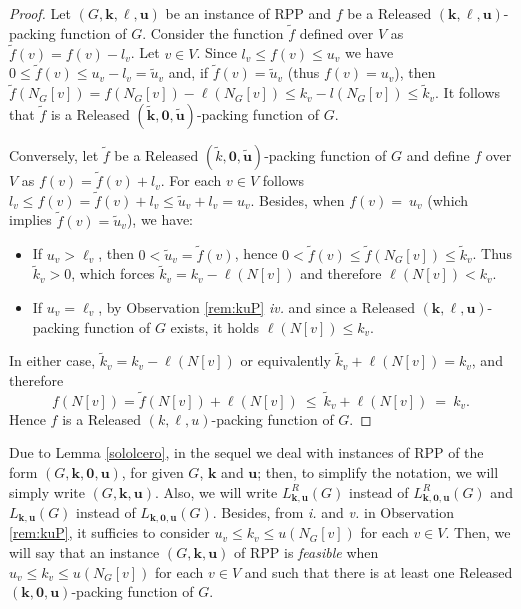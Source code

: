 \documentclass[preprint,12pt]{article}
\renewcommand{\leq}{\leqslant}
\theoremstyle{definition}
\begin{document}
\begin{proof} 
Let $(G, \mathbf{k}, \boldsymbol\ell, \mathbf{u})$  be an  instance of RPP and $f$  be a Released  $(\mathbf{k}, \boldsymbol\ell, \mathbf{u})$-packing function of $G$. Consider the function $\tilde f$ defined over $V$ as $\tilde f(v)=f(v)-l_v$. Let $v\in V$. Since $l_v\leq f(v)\leq u_v$ we have $0\leq \tilde f(v)\leq u_v-l_v=\tilde u_v$ and, if $\tilde f (v)=\tilde u_v$ (thus $f(v)=u_v$), then  $\tilde f(N_G[v])=f(N_G[v])-\boldsymbol\ell(N_G[v])\leq k_v-l(N_G[v])\leq\tilde k_v$.  
It follows that $\tilde f$ is a Released $(\tilde{ \mathbf{k}},\mathbf{0}, \tilde{\mathbf{u}})$-packing function of $G$.

 Conversely, let $\tilde f$ be a Released $(\tilde k,\mathbf{0}, \tilde{\mathbf{u}})$-packing function of $G$ and  define $f$ over $V$ as $f(v)=\tilde {f}(v)+l_v$. For each $v\in V$ follows  $l_v\leq f(v)= \tilde f(v)+l_v\leq \tilde u_v+l_v=u_v$. 
  Besides, when $f (v)= \ u_v$ (which implies $\tilde f (v)= \tilde u_v$), we have:
  
\begin{itemize}
    \item 
If $u_v>\ell_v$, then $0<\tilde u_v=\tilde{f}(v)$, hence
        $0<\tilde f(v)\le\tilde f(N_G[v])\le\tilde k_v$. Thus $\tilde k_v>0$, which
        forces $\tilde k_v=k_v-\ell(N[v])$ and therefore $\ell(N[v])<k_v$.
\item If $u_v=\ell_v$, by Observation \ref{rem:kuP} \textit{iv.} and since a Released $(\mathbf{k}, \boldsymbol\ell, \mathbf{u})$-packing function of $G$ exists, it holds $\ell(N[v])\le k_v$.
\end{itemize}
In either case, $\tilde k_v=k_v-\ell(N[v])$ or equivalently   $\tilde k_v+\ell(N[v])=k_v$, and therefore 
\[
  f(N[v])=\tilde f(N[v])+\ell(N[v])\ \le\ \tilde k_v+\ell(N[v])\ =\ k_v .
\]
Hence $f$ is a Released $(k,\boldsymbol\ell,u)$-packing function of $G$. 
\end{proof}


Due to Lemma \ref{sololcero}, in the sequel we deal with instances of RPP  of the form $(G, \mathbf{k}, \mathbf{0}, \mathbf{u})$, for given $G$, $\mathbf{k}$ and $\mathbf{u}$; then, to simplify the notation, we will simply write $(G, \mathbf{k}, \mathbf{u})$.  Also, we will write   $L^R_{\mathbf{k},\mathbf{u}}(G)$ instead of $L^R_{\mathbf{k},\mathbf{0},\mathbf{u}}(G)$ and  $L_{\mathbf{k}, \mathbf{u}}(G)$ instead of $L_{\mathbf{k},\mathbf{0}, \mathbf{u}}(G)$. 
Besides, from \textit{i.} and \textit{v.} in  Observation \ref{rem:kuP}, it sufficies to consider  $u_v \leq k_v \leq u(N_G[v])$ for each $v\in V$. Then, we will say that an instance $(G, \mathbf{k}, \mathbf{u})$ of RPP is \emph{feasible}  when $u_v \leq k_v \leq u(N_G[v])$ for each $v\in V$ and such that there is at least one Released  $(\mathbf{k}, \mathbf{0}, \mathbf{u})$-packing function of $G$. 
\end{document}
